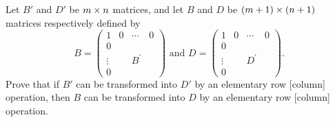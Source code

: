 \begin{exercise} \label{exercise 3.2.12}
Let \(B'\) and \(D'\) be \(m \times n\) matrices, and let \(B\) and \(D\) be \((m + 1) \times (n + 1)\) matrices respectively defined by
\[
    B = \left(\begin{array}{c|ccc}
        1 & 0 & \cdots & 0 \\
        \hline 0 & & & \\
        \vdots & & B^{\prime} & \\
        0 & & &
    \end{array}\right)
    \text { and }
    D = \left(\begin{array}{c|ccc}
        1 & 0 & \cdots & 0 \\
        \hline 0 & & \\
        \vdots & & D^{\prime} & \\
        0 & &
    \end{array}\right).
\]
Prove that if \(B'\) can be transformed into \(D'\) by an elementary row [column] operation, then \(B\) can be transformed into \(D\) by an elementary row [column] operation.
\end{exercise}

